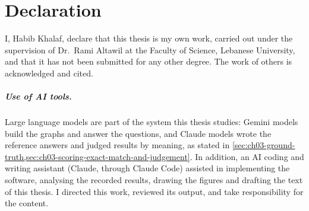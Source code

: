 \chapter*{Declaration}

I, Habib Khalaf, declare that this thesis is my own work, carried out under the supervision of Dr.~Rami Altawil at the
Faculty of Science, Lebanese University, and that it has not been submitted for any other degree. The work of others is
acknowledged and cited.

\paragraph{Use of AI tools.} Large language models are part of the system this thesis studies: Gemini models build the
graphs and answer the questions, and Claude models wrote the reference answers and judged results by meaning, as
stated in \cref{sec:ch03-ground-truth,sec:ch03-scoring-exact-match-and-judgement}. In addition, an AI coding and
writing assistant (Claude, through Claude Code) assisted in implementing the software, analysing the recorded results,
drawing the figures and drafting the text of this thesis. I directed this work, reviewed its output, and take
responsibility for the content.
